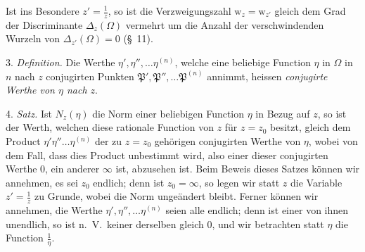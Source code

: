 \documentclass{article}
\begin{document}
Ist ins Besondere $z' = \frac{1}{z}$, so ist die Verzweigungszahl $\mathrm{w}_{z} = \mathrm{w}_{z'}$ gleich dem Grad der Discriminante $\Delta_{z}(\Omega)$ vermehrt um die Anzahl der verschwindenden Wurzeln von $\Delta_{z'}(\Omega) = 0$ (§~11).

3. \emph{Definition.} Die Werthe $\eta', \eta'', \ldots \eta^{(n)}$, welche eine beliebige Function $\eta$ in $\Omega$ in $n$ nach $z$ conjugirten Punkten $\mathfrak{P}', \mathfrak{P}'', \ldots \mathfrak{P}^{(n)}$ annimmt, heissen \emph{conjugirte Werthe von $\eta$ nach $z$}.

4. \emph{Satz.} Ist $N_{z}(\eta)$ die Norm einer beliebigen Function $\eta$ in Bezug auf $z$, so ist der Werth, welchen diese rationale Function von $z$ für $z = z_{0}$ besitzt, gleich dem Product $\eta'\eta''\ldots\eta^{(n)}$ der zu $z = z_{0}$ gehörigen conjugirten Werthe von $\eta$, wobei von dem Fall, dass dies Product unbestimmt wird, also einer dieser conjugirten Werthe 0, ein anderer $\infty$ ist, abzusehen ist. Beim Beweis dieses Satzes können wir annehmen, es sei $z_{0}$ endlich; denn ist $z_{0} = \infty$, so legen wir statt $z$ die Variable $z' = \frac{1}{z}$ zu Grunde, wobei die Norm ungeändert bleibt. Ferner können wir annehmen, die Werthe $\eta', \eta'', \ldots \eta^{(n)}$ seien alle endlich; denn ist einer von ihnen unendlich, so ist n.\ V.\ keiner derselben gleich 0, und wir betrachten statt $\eta$ die Function $\frac{1}{\eta}$.

\end{document}
